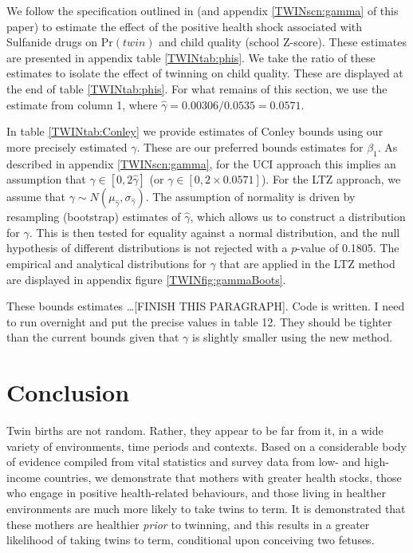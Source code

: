 \documentclass[subeqn]{article}
\begin{document}
\begin{spacing}{1.4}
We follow the specification outlined in \citet{BhalotraVenkataramani2014}
(and appendix \ref{TWINscn:gamma} of this paper) to estimate the effect of 
the positive health shock associated with Sulfanide drugs on Pr$(twin)$ and
child quality (school Z-score).  These estimates are presented in
appendix table \ref{TWINtab:phis}.  We take the ratio of these estimates to
isolate the effect of twinning on child quality.  These are displayed at the
end of table \ref{TWINtab:phis}.  For what remains of this section, we use 
the estimate from column 1, where $\hat\gamma=0.00306/0.0535=0.0571$.

In table \ref{TWINtab:Conley} we provide estimates of Conley bounds using 
our more precisely estimated $\gamma$.  These are our preferred bounds 
estimates for $\beta_1$.  As described in appendix \ref{TWINscn:gamma}, for 
the UCI approach this implies an assumption that $\gamma \in [0,2\hat\gamma]$
(or $\gamma \in [0,2\times 0.0571]$).  For the LTZ approach, we assume that 
$\gamma\sim N(\mu_{\hat\gamma},\sigma_{\hat\gamma})$.  The assumption of 
normality is driven by resampling (bootstrap) estimates of $\hat\gamma$,
which allows us to construct a distribution for $\gamma$.  This is then
tested for equality against a normal distribution, and the null hypothesis
of different distributions is not rejected with a $p$-value of 0.1805.  The 
empirical and analytical distributions for $\gamma$ that are applied in the 
LTZ method are displayed in appendix figure \ref{TWINfig:gammaBoots}.

These bounds estimates \ldots [FINISH THIS PARAGRAPH].  Code is written.  
I need to run overnight and put the precise values in table 12.  They 
should be tighter than the current bounds given that $\gamma$ is slightly 
smaller using the new method.


\section{Conclusion}                               \label{TWINscn:conclusion}
Twin births are not random.  Rather, they appear to be far from it, in a wide
variety of environments, time periods and contexts.  Based on a considerable 
body of evidence compiled from vital statistics and survey data from low- and 
high-income countries, we demonstrate that mothers with greater health stocks,
those who engage in positive health-related behaviours, and those living in 
healther environments are much more likely to take twins to term.  It is 
demonstrated that these mothers are healthier \emph{prior} to twinning, and
this results in a greater likelihood of taking twins to term, conditional upon
conceiving two fetuses.


\end{spacing}
\end{document}
